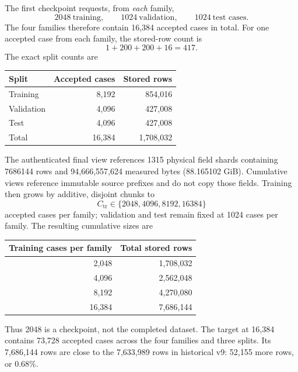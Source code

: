\documentclass[10pt]{article}
\begin{document}
The first checkpoint requests, from \emph{each} family,
\[
  2048\ \text{training},\qquad
  1024\ \text{validation},\qquad
  1024\ \text{test cases}.
\]
The four families therefore contain 16,384 accepted cases in total.
For one accepted case from each family, the stored-row count is
\[
  1+200+200+16=417.
\]
The exact split counts are
\begin{table}[ht]
  \centering
  \small
  \begin{tabular}{lrr}
    \toprule
    Split & Accepted cases & Stored rows\\
    \midrule
    Training & 8,192 & 854,016\\
    Validation & 4,096 & 427,008\\
    Test & 4,096 & 427,008\\
    \midrule
    Total & 16,384 & 1,708,032\\
    \bottomrule
  \end{tabular}
\end{table}
The authenticated final view references 1315 physical field shards containing
7686144 rows and 94,666,557,624 measured bytes (88.165102 GiB).  Cumulative
views reference immutable source prefixes and do not copy those fields.
Training then grows by additive, disjoint chunks to
\[
 C_{\mathrm{tr}}\in\{2048,4096,8192,16384\}
\]
accepted cases per family; validation and test remain fixed at 1024 cases per
family.  The resulting cumulative sizes are
\begin{center}
\begin{tabular}{rr}
  \toprule
  Training cases per family & Total stored rows \\
  \midrule
  2,048  & 1,708,032 \\
  4,096  & 2,562,048 \\
  8,192  & 4,270,080 \\
  16,384 & 7,686,144 \\
  \bottomrule
\end{tabular}
\end{center}
Thus 2048 is a checkpoint, not the completed dataset.  The target at 16,384
contains 73,728 accepted cases across the four families and three splits.
Its 7,686,144 rows are close to the 7,633,989 rows in historical v9: 52,155
more rows, or 0.68\%.
\end{document}
